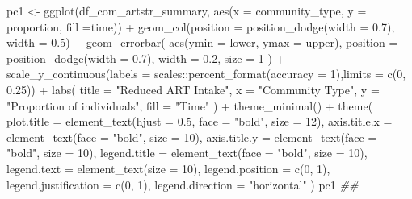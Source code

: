 \documentclass[
  letterpaper,
  DIV=11,
  numbers=noendperiod]{scrartcl}
\newenvironment{Shaded}{\begin{snugshade}}{\end{snugshade}}
\newcommand{\AttributeTok}[1]{\textcolor[rgb]{0.40,0.45,0.13}{#1}}
\newcommand{\DecValTok}[1]{\textcolor[rgb]{0.68,0.00,0.00}{#1}}
\newcommand{\DocumentationTok}[1]{\textcolor[rgb]{0.37,0.37,0.37}{\textit{#1}}}
\newcommand{\FloatTok}[1]{\textcolor[rgb]{0.68,0.00,0.00}{#1}}
\newcommand{\FunctionTok}[1]{\textcolor[rgb]{0.28,0.35,0.67}{#1}}
\newcommand{\NormalTok}[1]{\textcolor[rgb]{0.00,0.23,0.31}{#1}}
\newcommand{\OtherTok}[1]{\textcolor[rgb]{0.00,0.23,0.31}{#1}}
\newcommand{\SpecialCharTok}[1]{\textcolor[rgb]{0.37,0.37,0.37}{#1}}
\newcommand{\StringTok}[1]{\textcolor[rgb]{0.13,0.47,0.30}{#1}}
\begin{document}
\begin{Shaded}
\begin{Highlighting}[]
\NormalTok{pc1 }\OtherTok{\textless{}{-}} \FunctionTok{ggplot}\NormalTok{(df\_com\_artstr\_summary, }\FunctionTok{aes}\NormalTok{(}\AttributeTok{x =}\NormalTok{ community\_type, }\AttributeTok{y =}\NormalTok{ proportion, }\AttributeTok{fill =}\NormalTok{time)) }\SpecialCharTok{+}
  \FunctionTok{geom\_col}\NormalTok{(}\AttributeTok{position =} \FunctionTok{position\_dodge}\NormalTok{(}\AttributeTok{width =} \FloatTok{0.7}\NormalTok{), }\AttributeTok{width =} \FloatTok{0.5}\NormalTok{) }\SpecialCharTok{+}
  \FunctionTok{geom\_errorbar}\NormalTok{(}
    \FunctionTok{aes}\NormalTok{(}\AttributeTok{ymin =}\NormalTok{ lower, }\AttributeTok{ymax =}\NormalTok{ upper),}
    \AttributeTok{position =} \FunctionTok{position\_dodge}\NormalTok{(}\AttributeTok{width =} \FloatTok{0.7}\NormalTok{),}
    \AttributeTok{width =} \FloatTok{0.2}\NormalTok{,}
    \AttributeTok{size =} \DecValTok{1}
\NormalTok{  ) }\SpecialCharTok{+}
  \FunctionTok{scale\_y\_continuous}\NormalTok{(}\AttributeTok{labels =}\NormalTok{ scales}\SpecialCharTok{::}\FunctionTok{percent\_format}\NormalTok{(}\AttributeTok{accuracy =} \DecValTok{1}\NormalTok{),}\AttributeTok{limits =} \FunctionTok{c}\NormalTok{(}\DecValTok{0}\NormalTok{, }\FloatTok{0.25}\NormalTok{)) }\SpecialCharTok{+}
  \FunctionTok{labs}\NormalTok{(}
    \AttributeTok{title =} \StringTok{"Reduced ART Intake"}\NormalTok{,}
    \AttributeTok{x =} \StringTok{"Community Type"}\NormalTok{,}
    \AttributeTok{y =} \StringTok{"Proportion of individuals"}\NormalTok{,}
    \AttributeTok{fill =} \StringTok{"Time"}
\NormalTok{  ) }\SpecialCharTok{+}
  \FunctionTok{theme\_minimal}\NormalTok{() }\SpecialCharTok{+}
  \FunctionTok{theme}\NormalTok{(}
    \AttributeTok{plot.title =} \FunctionTok{element\_text}\NormalTok{(}\AttributeTok{hjust =} \FloatTok{0.5}\NormalTok{, }\AttributeTok{face =} \StringTok{"bold"}\NormalTok{, }\AttributeTok{size =} \DecValTok{12}\NormalTok{),}
    \AttributeTok{axis.title.x =} \FunctionTok{element\_text}\NormalTok{(}\AttributeTok{face =} \StringTok{"bold"}\NormalTok{, }\AttributeTok{size =} \DecValTok{10}\NormalTok{),}
    \AttributeTok{axis.title.y =} \FunctionTok{element\_text}\NormalTok{(}\AttributeTok{face =} \StringTok{"bold"}\NormalTok{, }\AttributeTok{size =} \DecValTok{10}\NormalTok{),}
    \AttributeTok{legend.title =} \FunctionTok{element\_text}\NormalTok{(}\AttributeTok{face =} \StringTok{"bold"}\NormalTok{, }\AttributeTok{size =} \DecValTok{10}\NormalTok{),}
    \AttributeTok{legend.text =} \FunctionTok{element\_text}\NormalTok{(}\AttributeTok{size =} \DecValTok{10}\NormalTok{),}
    \AttributeTok{legend.position =} \FunctionTok{c}\NormalTok{(}\DecValTok{0}\NormalTok{, }\DecValTok{1}\NormalTok{),}
    \AttributeTok{legend.justification =} \FunctionTok{c}\NormalTok{(}\DecValTok{0}\NormalTok{, }\DecValTok{1}\NormalTok{),}
    \AttributeTok{legend.direction =} \StringTok{"horizontal"}
\NormalTok{  )}
\NormalTok{pc1 }\DocumentationTok{\#\# }
\end{Highlighting}
\end{Shaded}
\end{document}
